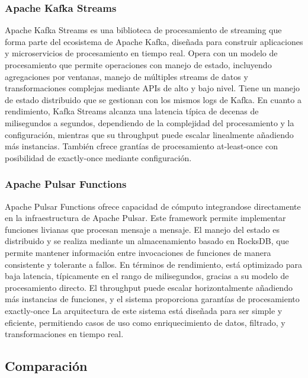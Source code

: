 \newpage
\subsubsection{Apache Kafka Streams}

Apache Kafka Streams es una biblioteca de procesamiento de streaming que forma parte del ecosistema de Apache Kafka, diseñada para construir aplicaciones y microservicios de procesamiento en tiempo real.
Opera con un modelo de procesamiento que permite operaciones con manejo de estado, incluyendo agregaciones por ventanas, manejo de múltiples streams de datos 
y transformaciones complejas mediante APIs de alto y bajo nivel. Tiene un manejo de estado distribuido que se gestionan con los mismos logs de Kafka.
En cuanto a rendimiento, Kafka Streams alcanza una latencia típica de decenas de milisegundos a segundos, dependiendo de la complejidad del procesamiento y la configuración, 
mientras que su throughput puede escalar linealmente añadiendo más instancias. También cfrece grantías de procesamiento at-least-once con posibilidad de exactly-once mediante configuración.


\subsubsection{Apache Pulsar Functions}

Apache Pulsar Functions ofrece capacidad de cómputo integrandose directamente en la infraestructura de Apache Pulsar. 
Este framework permite implementar funciones livianas que procesan mensaje a mensaje. 
El manejo del estado es distribuido y se realiza mediante un almacenamiento basado en RocksDB, que permite mantener información 
entre invocaciones de funciones de manera consistente y tolerante a fallos. En términos de rendimiento, está optimizado para baja latencia, típicamente en el rango de milisegundos, 
gracias a su modelo de procesamiento directo. 
El throughput puede escalar horizontalmente añadiendo más instancias de funciones, y el sistema proporciona garantías de procesamiento exactly-once 
La arquitectura de este sistema está diseñada para ser simple y eficiente, permitiendo casos de uso como enriquecimiento de datos, filtrado, y transformaciones 
en tiempo real.


\newpage
\subsection{Comparación}

